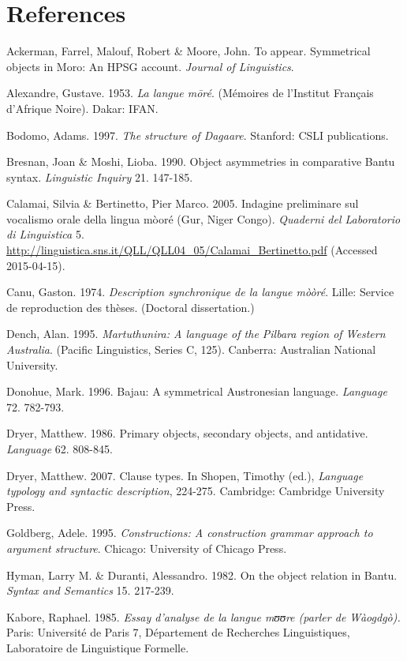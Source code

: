 \documentclass[output=paper]{langsci/langscibook}
\begin{document}
{{{{{{{\section{References}

Ackerman, Farrel, Malouf, Robert \& Moore, John. To appear. Symmetrical objects in Moro: An HPSG account. \textit{Journal of Linguistics}. 

Alexandre, Gustave. 1953. \textit{La langue m\=oré}. (M\'{e}moires de l’Institut Français d’Afrique Noire). Dakar: IFAN. 

Bodomo, Adams. 1997. \textit{The structure of Dagaare}. Stanford: CSLI publications.

Bresnan, Joan \& Moshi, Lioba. 1990. Object asymmetries in comparative Bantu syntax. \textit{Linguistic Inquiry} 21. 147-185. 

Calamai, Silvia \& Bertinetto, Pier Marco. 2005. Indagine preliminare sul vocalismo orale della lingua m\`{o}or\'{e} (Gur, Niger Congo). \textit{Quaderni del Laboratorio di Linguistica} 5. \url{http://linguistica.sns.it/QLL/QLL04_05/Calamai_Bertinetto.pdf} (Accessed 2015-04-15). 

Canu, Gaston. 1974. \textit{Description synchronique de la langue mò\`{o}r\'{e}}. Lille: Service de reproduction des thèses. (Doctoral dissertation.)

Dench, Alan. 1995. \textit{Martuthunira: A language of the Pilbara region of Western Australia}. (Pacific Linguistics, Series C, 125). Canberra: Australian National University.  

Donohue, Mark. 1996. Bajau: A symmetrical Austronesian language. \textit{Language} 72. 782-793.

Dryer, Matthew. 1986. Primary objects, secondary objects, and antidative. \textit{Language} 62. 808-845.

Dryer, Matthew. 2007. Clause types. In Shopen, Timothy (ed.), \textit{Language typology and syntactic description}, 224-275. Cambridge: Cambridge University Press. 

Goldberg, Adele. 1995. \textit{Constructions: A construction grammar approach to argument structure}. Chicago: University of Chicago Press. 

Hyman, Larry M. \& Duranti, Alessandro. 1982. On the object relation in Bantu. \textit{Syntax and Semantics} 15. 217-239. 

Kabore, Raphael. 1985. \textit{Essay d’analyse de la langue mʊʊre (parler de W\`{a}ogdg\`{o}).} Paris: Universit\'{e} de Paris 7, D\'{e}partement de Recherches Linguistiques, Laboratoire de Linguistique Formelle. 

}}}}}}}
\end{document}
